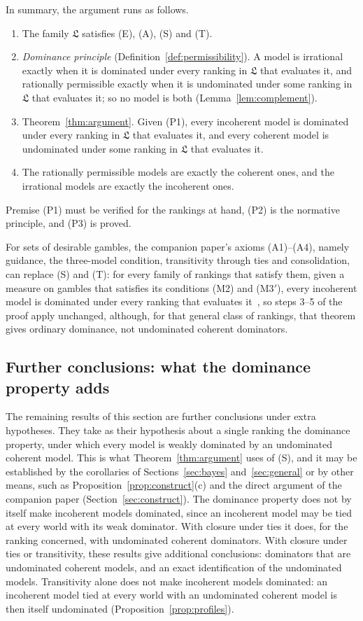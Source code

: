 \documentclass[11pt]{article}
\theoremstyle{definition}
\theoremstyle{remark}
\newcommand{\Lf}{\mathfrak L}
\begin{document}
In summary, the argument runs as follows.
\begin{enumerate}[label=\textbf{(P\arabic*)},leftmargin=*]
\item The family $\Lf$ satisfies (E), (A), (S) and (T).
\item \emph{Dominance principle} (Definition~\ref{def:permissibility}). A model is irrational exactly when it is dominated under every ranking in $\Lf$ that evaluates it, and rationally permissible exactly when it is undominated under some ranking in $\Lf$ that evaluates it; so no model is both (Lemma~\ref{lem:complement}).
\item Theorem~\ref{thm:argument}. Given (P1), every incoherent model is dominated under every ranking in $\Lf$ that evaluates it, and every coherent model is undominated under some ranking in $\Lf$ that evaluates it.
\item[\textbf{(C)}] The rationally permissible models are exactly the coherent ones, and the irrational models are exactly the incoherent ones.
\end{enumerate}
Premise (P1) must be verified for the rankings at hand, (P2) is the normative principle, and (P3) is proved.

For sets of desirable gambles, the companion paper's axioms (A1)--(A4), namely guidance, the three-model condition, transitivity through ties and consolidation, can replace (S) and (T): for every family of rankings that satisfy them, given a measure on gambles that satisfies its conditions (M2) and (M3$'$), every incoherent model is dominated under every ranking that evaluates it~\cite[Theorem~4.1]{KCM}, so steps 3--5 of the proof apply unchanged, although, for that general class of rankings, that theorem gives ordinary dominance, not undominated coherent dominators.

\subsection{Further conclusions: what the dominance property adds}
The remaining results of this section are further conclusions under extra hypotheses. They take as their hypothesis about a single ranking the dominance property, under which every model is weakly dominated by an undominated coherent model. This is what Theorem~\ref{thm:argument} uses of (S), and it may be established by the corollaries of Sections~\ref{sec:bayes} and~\ref{sec:general} or by other means, such as Proposition~\ref{prop:construct}(c) and the direct argument of the companion paper (Section~\ref{sec:construct}). The dominance property does not by itself make incoherent models dominated, since an incoherent model may be tied at every world with its weak dominator. With closure under ties it does, for the ranking concerned, with undominated coherent dominators. With closure under ties or transitivity, these results give additional conclusions: dominators that are undominated coherent models, and an exact identification of the undominated models. Transitivity alone does not make incoherent models dominated: an incoherent model tied at every world with an undominated coherent model is then itself undominated (Proposition~\ref{prop:profiles}).
\end{document}
